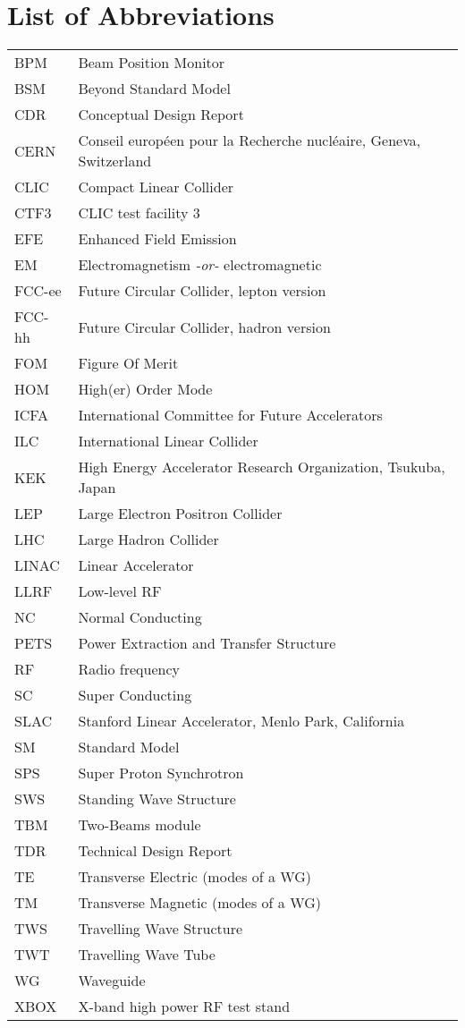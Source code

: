 \chapter*{List of Abbreviations}

\begin{tabular}{l l}
BPM		&	Beam Position Monitor\\
BSM		&	Beyond Standard Model\\
CDR		&	Conceptual Design Report\\
CERN	&	Conseil europ\'een pour la Recherche nucl\'eaire, Geneva, Switzerland\\
CLIC		&	Compact Linear Collider\\
CTF3	&	CLIC test facility 3\\
EFE		&	Enhanced Field Emission\\
EM		&	Electromagnetism \textit{-or-} electromagnetic\\
FCC-ee	&	Future Circular Collider, lepton version\\
FCC-hh	&	Future Circular Collider, hadron version\\
FOM		&	Figure Of Merit\\
HOM		&	High(er) Order Mode\\
ICFA		&	International Committee for Future Accelerators\\
ILC		&	International Linear Collider\\
KEK		&	High Energy Accelerator Research Organization, Tsukuba, Japan      \\  
LEP		&	Large Electron Positron Collider\\
LHC		&	Large Hadron Collider \\
LINAC	&	Linear Accelerator\\
LLRF	&	Low-level RF\\
NC		&	Normal Conducting\\
PETS	&	Power Extraction and Transfer Structure\\
RF		&	Radio frequency\\
SC		&	Super Conducting\\
SLAC	&	Stanford Linear Accelerator, Menlo Park, California\\
SM		&	Standard Model\\
SPS		&	Super Proton Synchrotron\\
SWS		&	Standing Wave Structure\\
TBM		&	Two-Beams module\\
TDR		&	Technical Design Report\\
TE		&	Transverse Electric (modes of a WG)\\
TM		&	Transverse Magnetic (modes of a WG)\\
TWS		&	Travelling Wave Structure\\
TWT		&	Travelling Wave Tube\\
WG		&	Waveguide\\
XBOX	&	X-band high power RF test stand\\
\end{tabular}